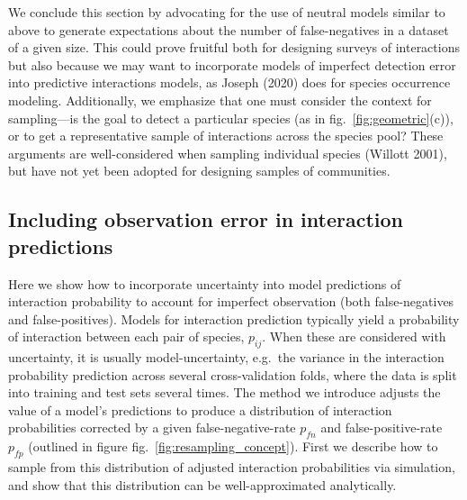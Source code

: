 \documentclass[10pt,oneside]{article}
\begin{document}
We conclude this section by advocating for the use of neutral models
similar to above to generate expectations about the number of
false-negatives in a dataset of a given size. This could prove fruitful
both for designing surveys of interactions but also because we may want
to incorporate models of imperfect detection error into predictive
interactions models, as Joseph (2020) does for species occurrence
modeling. Additionally, we emphasize that one must consider the context
for sampling---is the goal to detect a particular species (as in
fig.~\ref{fig:geometric}(c)), or to get a representative sample of
interactions across the species pool? These arguments are
well-considered when sampling individual species (Willott 2001), but
have not yet been adopted for designing samples of communities.

\hypertarget{including-observation-error-in-interaction-predictions}{%
\subsection{Including observation error in interaction
predictions}\label{including-observation-error-in-interaction-predictions}}

Here we show how to incorporate uncertainty into model predictions of
interaction probability to account for imperfect observation (both
false-negatives and false-positives). Models for interaction prediction
typically yield a probability of interaction between each pair of
species, \(p_{ij}\). When these are considered with uncertainty, it is
usually model-uncertainty, e.g.~the variance in the interaction
probability prediction across several cross-validation folds, where the
data is split into training and test sets several times. The method we
introduce adjusts the value of a model's predictions to produce a
distribution of interaction probabilities corrected by a given
false-negative-rate \(p_{fn}\) and false-positive-rate \(p_{fp}\)
(outlined in figure fig.~\ref{fig:resampling_concept}). First we
describe how to sample from this distribution of adjusted interaction
probabilities via simulation, and show that this distribution can be
well-approximated analytically.
\end{document}
